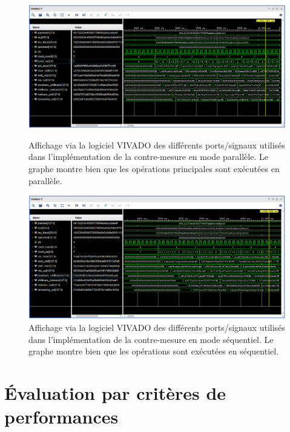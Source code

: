 \documentclass[oneside]{book}
\begin{document}
\begin{figure}[h!]
    \hspace{-0.5cm}
    \includegraphics[scale=0.53]{image/vivado_parallele}
    \caption{Affichage via la logiciel VIVADO des différents ports/signaux utilisés dans l'implémentation de la contre-mesure en mode parallèle. Le graphe montre bien que les opérations principales sont exécutées en parallèle.}
    \label{fig:signaux_test_autom_parallele} 
    \hspace{-0.5cm}
    \includegraphics[scale=0.53]{image/vivado_sequentiel}
    \caption{Affichage via la logiciel VIVADO des différents ports/signaux utilisés dans l'implémentation de la contre-mesure en mode séquentiel. Le graphe montre bien que les opérations sont exécutées en séquentiel.}
    \label{fig:signaux_test_autom_sequentiel} 
\end{figure}


\newpage

\section{Évaluation par critères de performances}
\label{sec:EvalPerf}
\end{document}
